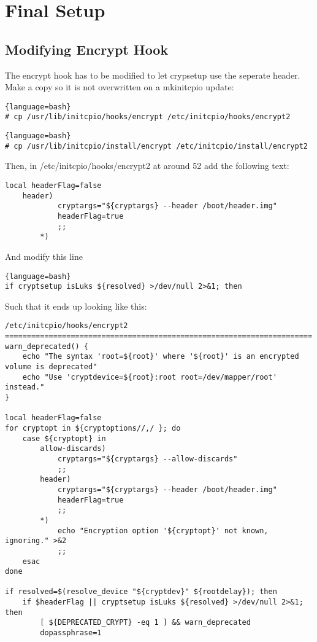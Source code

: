 \section{Final Setup}
\subsection{Modifying Encrypt Hook}
The encrypt hook has to be modified to let crypsetup use the seperate header. Make a copy so it is not overwritten on a mkinitcpio update:
\begin{lstlisting}{language=bash}
# cp /usr/lib/initcpio/hooks/encrypt /etc/initcpio/hooks/encrypt2
\end{lstlisting}
\begin{lstlisting}{language=bash}
# cp /usr/lib/initcpio/install/encrypt /etc/initcpio/install/encrypt2
\end{lstlisting}
Then, in /etc/initcpio/hooks/encrypt2 at around 52 add the following text:
\begin{verbatim}
local headerFlag=false
	header)
            cryptargs="${cryptargs} --header /boot/header.img"
            headerFlag=true
            ;;
        *)
\end{verbatim}
And modify this line
\begin{lstlisting}{language=bash}
if cryptsetup isLuks ${resolved} >/dev/null 2>&1; then
\end{lstlisting}
Such that it ends up looking like this:
\begin{verbatim}
/etc/initcpio/hooks/encrypt2
======================================================================
warn_deprecated() {
    echo "The syntax 'root=${root}' where '${root}' is an encrypted volume is deprecated"
    echo "Use 'cryptdevice=${root}:root root=/dev/mapper/root' instead."
}

local headerFlag=false
for cryptopt in ${cryptoptions//,/ }; do
    case ${cryptopt} in
        allow-discards)
            cryptargs="${cryptargs} --allow-discards"
            ;;
        header)
            cryptargs="${cryptargs} --header /boot/header.img"
            headerFlag=true
            ;;
        *)
            echo "Encryption option '${cryptopt}' not known, ignoring." >&2
            ;;
    esac
done

if resolved=$(resolve_device "${cryptdev}" ${rootdelay}); then
    if $headerFlag || cryptsetup isLuks ${resolved} >/dev/null 2>&1; then
        [ ${DEPRECATED_CRYPT} -eq 1 ] && warn_deprecated
        dopassphrase=1
\end{verbatim}



